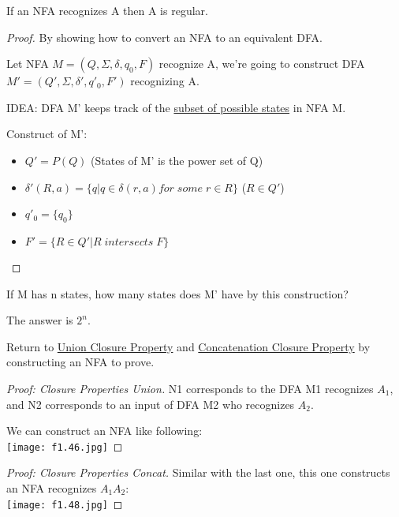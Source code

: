 \begin{theorem}
    If an NFA recognizes A then A is regular.
\end{theorem}
\begin{proof}
    By showing how to convert an NFA to an equivalent DFA.
    
    Let NFA \(M = (Q, \Sigma, \delta, q_0, F)\) recognize A, we're going to construct DFA \(M' = (Q', \Sigma, \delta', q'_0, F')\) recognizing A. 

    IDEA: DFA M' keeps track of the \underline{subset of possible states} in NFA M.

    Construct of M':
    \begin{itemize}
        \item \( Q' = P(Q) \)  (States of M' is the power set of Q)
        \item \(\delta'(R, a) = \{ q | q \in \delta(r, a) for \; some \; r \in R\} \) 
        (\(R \in Q'\))
        \item \(q'_0 = \{ q_0 \} \) 
        \item \(F' = \{ R \in Q' | R \; intersects \; F \} \) 
    \end{itemize}
\end{proof}

\begin{remark}
    If M has n states, how many states does M' have by this construction?

    The answer is \(2^n\). 
\end{remark}

Return to \hyperref[theorem: clousre properties union]{Union Closure Property} and \hyperref[theorem: clousre properties concat]{Concatenation Closure Property} by constructing an NFA to prove.

\begin{proof}[Proof: Closure Properties Union]
    N1 corresponds to the DFA M1 recognizes \(A_1\), and N2 corresponds to an input of DFA M2 who recognizes \(A_2\).  

    We can construct an NFA like following:\\
    \texttt{[image: f1.46.jpg]}
\end{proof}

\begin{proof}[Proof: Closure Properties Concat]
     Similar with the last one, this one constructs an NFA recognizes \(A_1A_2\):\\
    \texttt{[image: f1.48.jpg]}
\end{proof}

